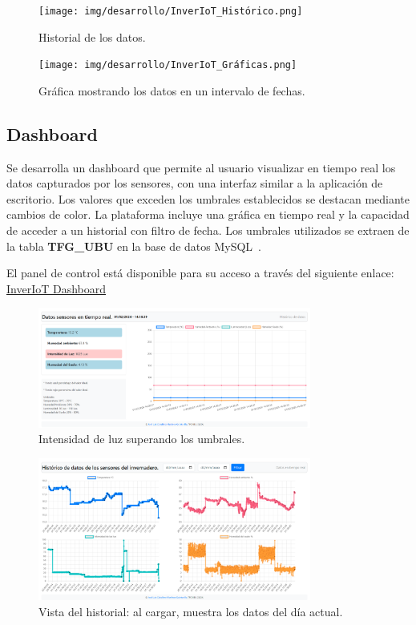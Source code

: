 \begin{itemize}
\begin{itemize}
\begin{figure}[h]
    \centering
    \texttt{[image: img/desarrollo/InverIoT\_Histórico.png]}
    \caption{Historial de los datos.}
\end{figure}


\begin{figure}[h]
    \centering
    \texttt{[image: img/desarrollo/InverIoT\_Gráficas.png]}
    \caption{Gráfica mostrando los datos en un intervalo de fechas.}
\end{figure}
\pagebreak

\subsection{Dashboard}
Se desarrolla un dashboard que permite al usuario visualizar en tiempo real los datos capturados por los sensores, con una interfaz similar a la aplicación de escritorio. Los valores que exceden los umbrales establecidos se destacan mediante cambios de color. La plataforma incluye una gráfica en tiempo real y la capacidad de acceder a un historial con filtro de fecha. Los umbrales utilizados se extraen de la tabla \textbf{TFG\_UBU} en la base de datos MySQL~\cite{misc:Mysql}.

El panel de control está disponible para su acceso a través del siguiente enlace: \href{http://www.inveriot.com}{InverIoT Dashboard}

\begin{figure}[h]
    \centering
    \includegraphics[width=0.8\textwidth]{img/desarrollo/Dashboard1.png}
    \caption{Intensidad de luz superando los umbrales.} \label{Img:Dashboard1}
\end{figure}

\begin{figure}[h]
    \centering
    \includegraphics[width=0.8\textwidth]{img/desarrollo/Dashboard_Historico.png}
    \caption{Vista del historial: al cargar, muestra los datos del día actual.} \label{Img:Dashboard_Historico}
\end{figure}


\end{itemize}
\end{itemize}
